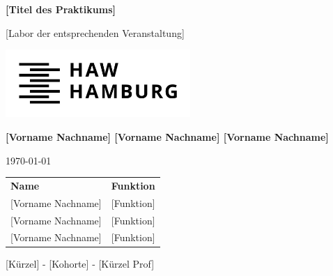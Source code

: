 \documentclass[12pt]{scrreprt}
\begin{document}
\begin{titlepage}
	
	
	\centering
	\begin{figure}
		\vspace*{1cm}	
	\end{figure}
	
	
	{\huge\bfseries [Titel des Praktikums]\par}
	
	\vspace{1cm}
	
	{\LARGE [Labor der entsprechenden Veranstaltung]\par}
	
	\vspace{1.5cm}
	
	\includegraphics[width=7cm]{img/HAW_logo_black.png}\par
	\vspace{1.5cm}
	
	
	{\large \bfseries [Vorname Nachname] \hspace{0.4cm} [Vorname Nachname] \hspace{0.4cm} [Vorname Nachname]\par}
	
	\vspace{1.5cm}

	{\large \today\par}

	\vspace{3cm}

	\begin{tabular}{lr}
		\rule[-1ex]{0pt}{2.5ex} \textbf{Name} \hspace{2cm} & \textbf{Funktion }\\ 
		\rule[-1ex]{0pt}{2.5ex} [Vorname Nachname] & [Funktion] \\ 
		\rule[-1ex]{0pt}{2.5ex} [Vorname Nachname] & [Funktion] \\ 
		\rule[-1ex]{0pt}{2.5ex} [Vorname Nachname]  & [Funktion] \\ 	
	\end{tabular} 

	\vfill
	{[Kürzel] - [Kohorte] - [Kürzel Prof]} 
	\vspace{2cm}
	

		
	
\end{titlepage}

\tableofcontents
\thispagestyle{fancy}




\end{document}
